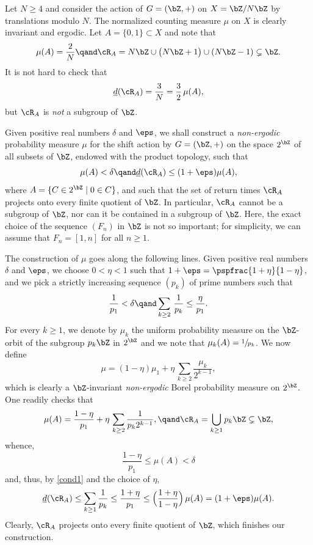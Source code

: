 
\begin{example}
Let $N \geq 4$ and consider the action of $G = (\bZ,+)$ on $X = \bZ/N\bZ$ by translations modulo $N$. The normalized counting measure $\mu$
on $X$ is clearly invariant and ergodic. Let \hbox{$A\!=\!\{0,1\}\!\subset\!X$} and note that
\[
\mu(A) = \frac{2}{N} \qand \cR_{A} = N \bZ \cup \bigl(N\bZ + 1\bigr) \cup (N\bZ - 1) \subsetneq \bZ.
\]
It is not hard to check that
\[
\underline{d}(\cR_A) = \frac{3}{N} = \frac{3}{2}\, \mu(A),
\]
but $\cR_A$ is \emph{not} a subgroup of $\bZ$.
\end{example}

\begin{example}
Given positive real numbers $\delta$ and $\eps$, we shall construct a \emph{non-ergodic} probability measure
$\mu$ for the shift action by $G = (\bZ,+)$ on the space $2^\bZ$ of all subsets of $\bZ$, endowed with the product topology, such that
\[
\mu(A) < \delta \qand \underline{d}(\cR_A) \leq (1+\eps)\mu(A),
\]
where $A = \{ C \in 2^\bZ \mid  0 \in C\}$, and such that the set of return times $\cR_A$ projects onto every finite quotient of $\bZ$. In
particular, $\cR_A$ cannot be a subgroup of $\bZ$, nor can it be contained in a subgroup of $\bZ$.
Here, the exact choice of the sequence $(F_n)$ in $\bZ$ is not so important; for simplicity, we can assume that $F_n = [1,n]$ for all $n \geq 1$.

The construction of $\mu$ goes along the following lines. Given positive real numbers~$\delta$ and $\eps$, we choose $0 < \eta < 1$ such that
$1 + \eps = \pspfrac{1+\eta}{1-\eta}$, and we pick a strictly increasing sequence $(p_k)$ of prime numbers such that
\begin{equation}
\label{cond1}
\frac{1}{p_1} < \delta \qand \sum_{k \geq 2} \, \frac{1}{p_k} \leq \frac{\eta}{p_1}.
\end{equation}
For every $k \geq 1$, we denote by $\mu_k$ the uniform probability measure on the $\bZ$-orbit of the subgroup $p_k \bZ$ in $2^{\bZ}$ and we note
that $\mu_k(A) = \sfrac{1}{p_k}$. We now define
\[
\mu = (1-\eta)\mu_1 + \eta \, \sum_{k \geq 2} \frac{\mu_k}{2^{k-1}},
\]
which is clearly a $\bZ$-invariant \emph{non-ergodic} Borel probability measure on $2^{\bZ}$. One readily checks that
\[
\mu(A) = \frac{1-\eta}{p_1} + \eta \, \sum_{k \geq 2} \frac{1}{p_k 2^{k-1}},
\qand
\cR_A = \bigcup_{k \geq 1} p_k \bZ \subsetneq \bZ,
\]
whence,
\[
\frac{1-\eta}{p_1} \leq \mu(A) < \delta
\]
and, thus, by \eqref{cond1} and the choice of $\eta$,
\[
\underline{d}(\cR_A) \leq \sum_{k \geq 1} \frac{1}{p_k} \leq \frac{1+\eta}{p_1} \leq \Big( \frac{1+\eta}{1-\eta} \Big) \, \mu(A) = (1+\eps)\mu(A).
\]
Clearly, $\cR_A$ projects onto every finite quotient of $\bZ$, which finishes our construction.
\end{example}

